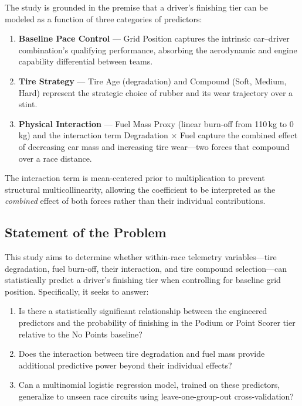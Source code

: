 The study is grounded in the premise that a driver's finishing tier can be
modeled as a function of three categories of predictors:

\begin{enumerate}[label=(\arabic*)]
  \item \textbf{Baseline Pace Control} --- Grid Position captures the
    intrinsic car--driver combination's qualifying performance, absorbing
    the aerodynamic and engine capability differential between teams.
  \item \textbf{Tire Strategy} --- Tire Age (degradation) and Compound
    (Soft, Medium, Hard) represent the strategic choice of rubber and its
    wear trajectory over a stint.
  \item \textbf{Physical Interaction} --- Fuel Mass Proxy (linear burn-off
    from 110\,kg to 0\,kg) and the interaction term Degradation $\times$
    Fuel capture the combined effect of decreasing car mass and increasing
    tire wear---two forces that compound over a race distance.
\end{enumerate}

\noindent
The interaction term is mean-centered prior to multiplication to prevent
structural multicollinearity, allowing the coefficient to be interpreted as
the \textit{combined} effect of both forces rather than their individual
contributions.

\subsection{Statement of the Problem}

This study aims to determine whether within-race telemetry variables---tire
degradation, fuel burn-off, their interaction, and tire compound
selection---can statistically predict a driver's finishing tier when
controlling for baseline grid position. Specifically, it seeks to answer:

\begin{enumerate}
  \item Is there a statistically significant relationship between the
    engineered predictors and the probability of finishing in the Podium or
    Point Scorer tier relative to the No Points baseline?
  \item Does the interaction between tire degradation and fuel mass provide
    additional predictive power beyond their individual effects?
  \item Can a multinomial logistic regression model, trained on these
    predictors, generalize to unseen race circuits using leave-one-group-out
    cross-validation?
\end{enumerate}

